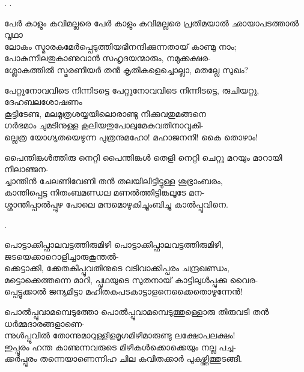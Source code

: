 \begin{enumerate}
.
.


\begin{slokam}{\VSv}{\VKG}{പേർ കാളും കവിമല്ലരെ}
 പേർ കാളും കവിമല്ലരെ പ്രതിമയാൽ ഛായാപടത്താൽ വൃഥാ\\
ലോകം സ്മാരകമേർപ്പെടുത്തിയഭിനന്ദിക്കുന്നതായ്‌ കാണ്മു നാം;\\
പോകുന്നീലതുകാണുവാൻ സഹൃദയന്മാരും, നമുക്കക്ഷര-\\
ശ്ലോകത്തിൽ സ്മരണീയർ തൻ കൃതികളെച്ചൊല്ലാ, മതല്ലേ സുഖം?
\end{slokam}


\begin{slokam}{\VKm}{\PCM}{പേറ്റുനോവവിടെ നിന്നിടട്ടെ}
 പേറ്റുനോവവിടെ നിന്നിടട്ടെ, രുചിയറ്റു, ദേഹബലശോഷണം\\
കൂട്ടിടേണ്ട, മലമൂത്രശയ്യയിലൊരാണ്ടു നീക്കുവതുമങ്ങനെ\\
ഗർഭമാം ചുമടിനുള്ള കൂലിയതുപോലുമേകുവതിനാവുകി-\\
ല്ലെത്ര യോഗ്യതയെഴുന്ന പുത്രനുമഹോ! മഹാജനനി! കൈ തൊഴാം!
\end{slokam}



\begin{slokam}{\VSv}{\VNM}{പൈന്തിങ്കൾത്തിരു നെറ്റി}
പൈന്തിങ്കൾ തെളി നെറ്റി ചെറ്റു മറയും മാറായി നീലാഞ്ജന-\\
ച്ചാന്തിൻ ചേലണിവേണി തൻ തലയിലിട്ടിട്ടുള്ള ശുഭ്രാംബരം,\\
കാന്തിപ്പെട്ട നിതംബമണ്ഡല മണൽത്തിട്ടിങ്കലൂടേ മന-\\
ശ്ശാന്തിപ്പാൽപ്പുഴ പോലെ മന്ദമൊഴുകിച്ചുംബിച്ചു കാൽപ്പൂവിനെ.
\end{slokam}


.

\begin{slokam}{\VSr}{\VNM}{പൊട്ടാക്കിപ്ഫാലവട്ടത്തിരുമിഴി}
 പൊട്ടാക്കിപ്ഫാലവട്ടത്തിരുമിഴി, ജടയെക്കാറൊളിച്ചാരുകൂന്തൽ-\\
ക്കെട്ടാക്കി, ക്കേതകിപ്പൂവതിനുടെ വടിവാക്കിപ്പരം ചന്ദ്രഖണ്ഡം,\\
മട്ടൊക്കെത്തന്നെ മാറി, പ്പൃഥയുടെ സുതനായ്‌ കാട്ടിലുള്‍പ്പുക്കു വൈര-\\
പ്പെട്ടൂക്കാൽ ജന്യമിട്ടാ മഹിതകപടകാട്ടാളനെക്കൈതൊഴുന്നേൻ!
\end{slokam}



\begin{slokam}{\VSr}{\VNM}{പൊൽപ്പൂവാമമ്പെടുത്തോ}
പൊൽപ്പൂവാമമ്പെടുത്തുള്ളൊരു തിരുവടി തൻ ധർമ്മദാരങ്ങളാണെ-\\
ന്നുൾപ്പൂവിൽ തോന്നുമാറുള്ളിളമൃഗമിഴിമാരുണ്ടു ലക്ഷോപലക്ഷം! \\
ഇപ്പൂരം ഹന്ത കാണുന്നവരുടെ മിഴികൾക്കൊക്കെയും നല്ല പച്ച-\\
ക്കർപ്പൂരം തന്നെയാണെന്നിഹ ചില കവിതക്കാർ പുകഴ്ത്തിത്തുടങ്ങീ.
\end{slokam}


\end{enumerate}
